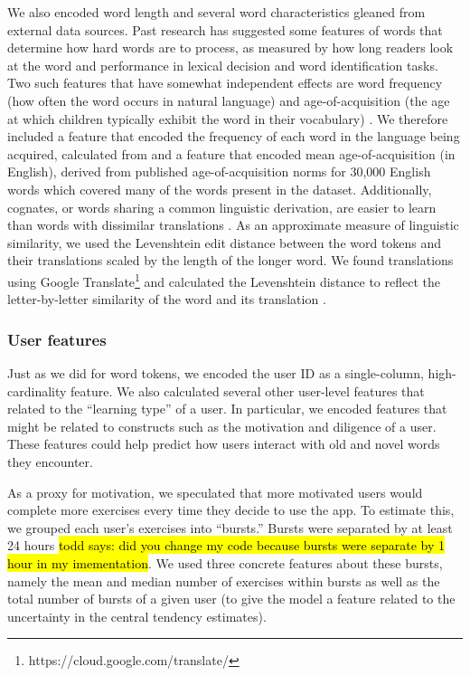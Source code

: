 \documentclass[11pt,a4paper]{article}
\begin{document}
We also encoded word length and several word characteristics gleaned from
external data sources. Past research has suggested some features of words that determine how hard words are to process, as measured by how long readers look at the word and performance in lexical decision and word identification tasks. Two such features that have somewhat independent effects are word frequency (how often the word occurs in natural language) \cite{rayner1998eye} and age-of-acquisition (the age at which children typically exhibit the word in their vocabulary) \cite{brysbaert2011effects, ferrand2011comparing}. We therefore included a feature that encoded the frequency of each word in the language being acquired, calculated from \citet{robert_speer_2017_998161} and a feature that encoded mean age-of-acquisition (in English), derived from published age-of-acquisition norms for 30,000 English words \cite{Kuperman2012} which covered many of the words present in the dataset. Additionally, cognates, or words sharing a common linguistic derivation, are easier to learn than words with dissimilar translations \cite{de2000hard}. As an approximate measure of linguistic similarity, we used the Levenshtein edit distance between the word tokens and their translations scaled by the length of the longer word. We found translations using Google Translate\footnote{https://cloud.google.com/translate/} and calculated the Levenshtein distance to reflect the letter-by-letter similarity of the word and its translation \cite{hyyro2001explaining}. 

\subsubsection{User features}

Just as we did for word tokens, we encoded the user ID as a single-column,
high-cardinality feature. We also calculated several other user-level features that related to the ``learning type'' of a user. In particular, we encoded features that might be related to constructs such as the motivation and diligence of a user. These features could help predict how users interact with old and novel words they encounter.

As a proxy for motivation, we speculated that more motivated users would complete more exercises every time they decide to use the app. To estimate this, we grouped each user's exercises into ``bursts.'' Bursts were separated by at least 24 hours \hl{todd says: did you change my code
because bursts were separate by 1 hour in my imementation}.  We used three
concrete features about these bursts, namely the mean and median number of
exercises within bursts as well as the total number of bursts of a given user (to give the model a feature related to the uncertainty in the central tendency estimates).
\end{document}
